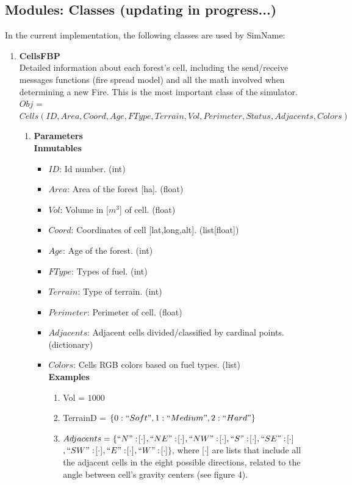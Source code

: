 \documentclass[11pt]{article}
\begin{document}
\subsection{Modules: Classes (updating in progress...)}
In the current implementation, the following classes are used by SimName:

\begin{enumerate}
	\item \textbf{CellsFBP} \\
Detailed information about each forest's cell, including the send/receive messages functions (fire spread model) and all the math involved when determining a new Fire. This is the most important class of the simulator.\\ $Obj$ = $Cells(ID,Area,Coord,Age,FType,Terrain,Vol,Perimeter,Status,Adjacents,Colors)$
\begin{enumerate}
	\item \textbf{Parameters}\\
 		\textbf{Inmutables} 
 			\begin{itemize}
 				\item $ID$: Id number. \hfill (int) 
 				\item $Area$: Area of the forest [ha]. \hfill (float)
 				\item $Vol$: Volume in [$m^{3}$] of cell. \hfill (float) 
 				\item $Coord$: Coordinates of cell [lat,long,alt]. \hfill (list[float])
 				\item $Age$: Age of the forest. \hfill (int) 
 				\item $FType$: Types of fuel. \hfill (int) 
 				\item $Terrain$: Type of terrain. \hfill (int)
 				\item $Perimeter$: Perimeter of cell. \hfill (float)
 				\item $Adjacents$: Adjacent cells divided/classified by cardinal points. \hfill (dictionary) \\
 				\item $Colors$: Cells RGB colors based on fuel types. \hfill (list) \\
 				
 				\textbf{Examples} 
 				 \begin{enumerate}
 					\item Vol = $1000$
 					\item TerrainD = $\lbrace 0: ``Soft", 1: ``Medium", 2: ``Hard"\rbrace$ 
 					\item $Adjacents = \lbrace``N": $[$\cdot$]$,``NE": $[$\cdot$]$,``NW": $[$\cdot$]$, ``S":$[$\cdot$]$ ,``SE":$[$\cdot$]$ ,``SW":$[$\cdot$]$ , ``E":$[$\cdot$]$, ``W":$[$\cdot$]$ \rbrace$, where [$\cdot$] are lists that include all the adjacent cells in the eight possible directions, related to the angle between cell's gravity centers (see figure 4). \\
 				 \end{enumerate}
 				

\end{itemize}
\end{enumerate}
\end{enumerate}
\end{document}

